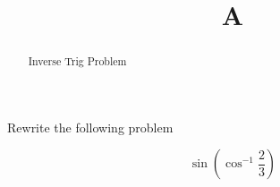 \documentclass{ximera}
\title[A]{A}
\begin{document}
\begin{abstract}
Inverse Trig Problem
\end{abstract}

\maketitle

Rewrite the following problem

\[ \sin \left (\cos^{-1}  \frac{2}{3} \right)\]

\begin{question}
\begin{multipleChoice}
\end{multipleChoice}
\end{question}
\end{document}
